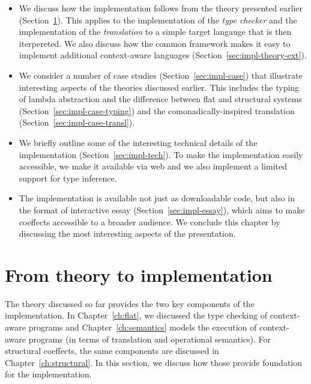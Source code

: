 \begin{itemize}
\item We discuss how the implementation follows from the theory presented earlier (Section~\ref{sec:impl-theory}).
  This applies to the implementation of the \emph{type checker} and the implementation of the \emph{translation}
  to a simple target langauge that is then iterpereted. We also discuss how the common framework makes it
  easy to implement additional context-aware languages (Section~\ref{sec:impl-theory-ext}).

\item We consider a number of case studies (Section~\ref{sec:impl-case}) that illustrate interesting
  aspects of the theories discussed earlier. This includes the typing of lambda abstraction and the
  difference between flat and structural systems (Section~\ref{sec:impl-case-typing}) and the
  comonadically-inspired translation (Section~\ref{sec:impl-case-transl}).

\item We briefly outline some of the interesting technical details of the implementation
  (Section~\ref{sec:impl-tech}). To make the implementation easily accessible, we make it
  available via web and we also implement a limited support for type inference.

\item The implementation is available not just as downloadable code, but also in the format of interactive essay
  (Section~\ref{sec:impl-essay}), which aims to make coeffects accessible to a broader audience.
  We conclude this chapter by discussing the most interesting aspects of the presentation.
\end{itemize}


%
%

\section{From theory to implementation}
\label{sec:impl-theory}

The theory discussed so far provides the two key components of the implementation. In
Chapter~\ref{ch:flat}, we discussed the type checking of context-aware programs and
Chapter~\ref{ch:semantics} models the execution of context-aware programs (in terms of
translation and operational semantics). For structural coeffects, the same components are discussed
in Chapter~\ref{ch:structural}. In this section, we discuss how those provide foundation for the
implementation.

